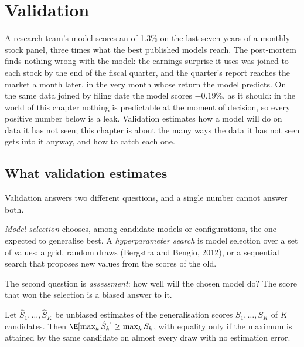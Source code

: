 \chapter{Validation}\label{ch:ml:validation}

A research team's model scores an  of 1.3\% on the last seven years of a monthly stock panel,
three times what the best published models reach. The post-mortem finds nothing wrong with the model: the earnings
surprise it uses was joined to each stock by the end of the fiscal quarter, and the quarter's report reaches the market
a month later, in the very month whose return the model predicts. On the same data joined by filing date the model
scores $-0.19\%$, as it should: in the world of this chapter nothing is predictable at the moment of decision, so every
positive number below is a leak. Validation estimates how a model will do on data it has not seen; this chapter is
about the many ways the data it has not seen gets into it anyway, and how to catch each one.

\section{What validation estimates}

Validation answers two different questions, and a single number cannot answer both.

\begin{definition}\label{def:ml:validation:selection}
\emph{Model selection} chooses, among candidate models or configurations, the one expected to
generalise best. A \emph{hyperparameter search} is model selection over a set of
 values: a grid, random draws (Bergstra and Bengio, 2012), or a sequential search that proposes new
values from the scores of the old.
\end{definition}

The second question is \emph{assessment}: how well will the chosen model do? The score that won the selection is a
biased answer to it.

\begin{proposition}\label{prop:ml:validation:max}
Let $\hat S_1,\dots,\hat S_K$ be unbiased estimates of the generalisation scores $S_1,\dots,S_K$ of $K$ candidates. Then
$\E[\max_k\hat S_k] \ge \max_kS_k$, with equality only if the maximum is attained by the same candidate on almost every
draw with no estimation error.
\end{proposition}

